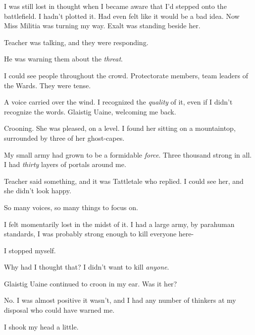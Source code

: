 I was still lost in thought when I became aware that I'd stepped onto the battlefield.  I hadn't plotted it.  Had even felt like it would be a bad idea.  Now Miss Militia was turning my way.  Exalt was standing beside her.



Teacher was talking, and they were responding.



He was warning them about the \emph{threat}.



I could see people throughout the crowd.  Protectorate members, team leaders of the Wards.  They were tense.



A voice carried over the wind.  I recognized the \emph{quality} of it, even if I didn't recognize the words.  Glaistig Uaine, welcoming me back.



Crooning.  She was pleased, on a level.  I found her sitting on a mountaintop, surrounded by three of her ghost-capes.



My small army had grown to be a formidable \emph{force}.  Three thousand strong in all.  I had \emph{thirty} layers of portals around me.



Teacher said something, and it was Tattletale who replied.  I could see her, and she didn't look happy.



So many voices, so many things to focus on.



I felt momentarily lost in the midst of it.  I had a large army, by parahuman standards, I was probably strong enough to kill everyone here-



I stopped myself.



Why had I thought that?  I didn't want to kill \emph{anyone}.



Glaistig Uaine continued to croon in my ear.  Was it her?



No.  I was almost positive it wasn't, and I had any number of thinkers at my disposal who could have warned me.



I shook my head a little.



